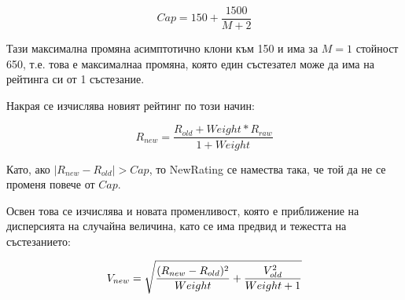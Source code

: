 \documentclass[a4paper,12pt]{article}
\begin{document}
  \begin{equation}
    Cap = 150 + \frac{1500}{M + 2}
  \end{equation}
  
  Тази максимална промяна асимптотично клони към 150 и има за \(M=1\) стойност 650, т.е. това е максималнаа промяна, която един състезател може да има на рейтинга си от 1 състезание.
  
  Накрая се изчислява новият рейтинг по този начин:
  
  \begin{equation}
    R_{new} = \frac{R_{old} + Weight * R_{raw}}{1 + Weight}
  \end{equation}

  Като, ако \(|R_{new} - R_{old}| > Cap\), то NewRating се намества така, че той да не се променя повече от \(Cap\).
  
  Освен това се изчислява и новата променливост, която е приближение на дисперсията на случайна величина, като се има предвид и тежестта на състезанието:
  
  \begin{equation}
    V_{new}=\sqrt{\\
    \frac{(R_{new} - R_{old})^2}{Weight}\\
    +\\
    \frac{V_{old}^2}{Weight + 1}\\
    }
  \end{equation}
  
\end{document}
